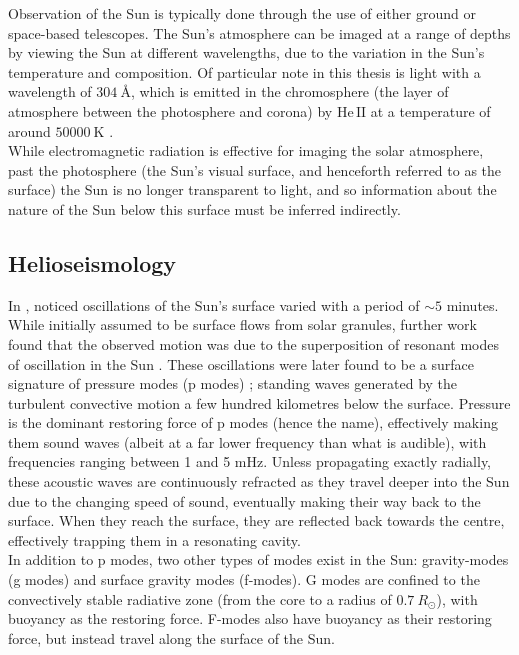 \documentclass[11pt,a4paper,onecolumn]{report}
\newcommand*\chem[1]{\ensuremath{\mathrm{#1}}}
\begin{document}
Observation of the Sun is typically done through the use of either ground or
space-based telescopes. The Sun's atmosphere can be imaged at a range of depths
by viewing the Sun at different wavelengths, due to the variation in the Sun's
temperature and composition. Of particular note in this thesis is light with a
wavelength of \(\SI{304}{\angstrom}\), which is emitted in the chromosphere (the
layer of atmosphere between the photosphere and corona) by \(\chem{He \, II}\)
at a temperature of around \(\SI{50000}{\kelvin}\)
\citep{herbert_friedman_solar_1962}. \\

While electromagnetic radiation is effective for imaging the solar atmosphere,
past the photosphere (the Sun's visual surface, and henceforth referred to as
the surface) the Sun is no longer transparent to light, and so information about
the nature of the Sun below this surface must be inferred indirectly. \\


%
\subsection{Helioseismology}
%
\label{sec:HSM}

In \citeyear{leighton_velocity_1962}, \citeauthor{leighton_velocity_1962}
noticed oscillations of the Sun's surface varied with a period of \(\sim
5\) minutes. While initially assumed to be surface flows from solar granules,
further work found that the observed motion was due to the superposition of
resonant modes of oscillation in the Sun \citep{ulrich_five-minute_1970}. These
oscillations were later found to be a surface signature of pressure modes
(p modes) \citep{deubner_observations_1975}; standing waves generated by the
turbulent convective motion a few hundred kilometres below the surface. Pressure
is the dominant restoring force of p modes (hence the name), effectively making
them sound waves (albeit at a far lower frequency than what is audible), with
frequencies ranging between 1 and 5 mHz. Unless propagating exactly radially,
these acoustic waves are continuously refracted as they travel deeper into the
Sun due to the changing speed of sound, eventually making their way back to the
surface. When they reach the surface, they are reflected back towards the
centre, effectively trapping them in a resonating cavity. \\

In addition to p modes, two other types of modes exist in the Sun: gravity-modes
(g modes) and surface gravity modes (f-modes). G modes are confined to the
convectively stable radiative zone (from the core to a radius of $\SI{0.7}
{R_\odot}$), with buoyancy as the restoring force. F-modes also have buoyancy as
their restoring force, but instead travel along the surface of the Sun. \\
\end{document}
